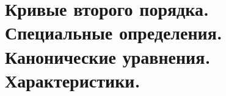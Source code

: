 \section{Кривые второго порядка. Специальные определения. Канонические уравнения. Характеристики.}

\pagebreak
